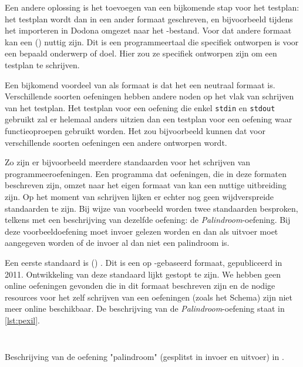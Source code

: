 Een andere oplossing is het toevoegen van een bijkomende stap voor het testplan: het testplan wordt dan in een ander formaat geschreven, en bijvoorbeeld tijdens het importeren in Dodona omgezet naar het -bestand.
Voor dat andere formaat kan een  () nuttig zijn.
Dit is een programmeertaal die specifiek ontworpen is voor een bepaald onderwerp of doel.
Hier zou ze specifiek ontworpen zijn om een testplan te schrijven.

Een bijkomend voordeel van  als formaat is dat het een neutraal formaat is.
Verschillende soorten oefeningen hebben andere noden op het vlak van schrijven van het testplan.
Het testplan voor een oefening die enkel \texttt{stdin} en \texttt{stdout} gebruikt zal er helemaal anders uitzien dan een testplan voor een oefening waar functieoproepen gebruikt worden.
Het zou bijvoorbeeld kunnen dat voor verschillende soorten oefeningen een andere  ontworpen wordt.

Zo zijn er bijvoorbeeld meerdere standaarden voor het schrijven van programmeeroefeningen.
Een programma dat oefeningen, die in deze formaten beschreven zijn, omzet naar het eigen formaat van \tested{} kan een nuttige uitbreiding zijn.
Op het moment van schrijven lijken er echter nog geen wijdverspreide standaarden te zijn.
Bij wijze van voorbeeld worden twee standaarden besproken, telkens met een beschrijving van dezelfde oefening: de \emph{Palindroom}-oefening.
Bij deze voorbeeldoefening moet invoer gelezen worden en dan als uitvoer moet aangegeven worden of de invoer al dan niet een palindroom is.

Een eerste standaard is  () \autocite{queiros2011pexil}.
Dit is een op -gebaseerd formaat, gepubliceerd in 2011.
Ontwikkeling van deze standaard lijkt gestopt te zijn.
We hebben geen online oefeningen gevonden die in dit formaat beschreven zijn en de nodige resources voor het zelf schrijven van een oefeningen (zoals het  Schema) zijn niet meer online beschikbaar.
De beschrijving van de \emph{Palindroom}-oefening staat in \cref{lst:pexil}.

\begin{listing}
    \inputminted{xml}{code/pexil-in.xml}
    \inputminted{xml}{code/pexil-out.xml}
    \caption{Beschrijving van de oefening "palindroom" (gesplitst in invoer en uitvoer) in .}
    \label{lst:pexil}
\end{listing}

